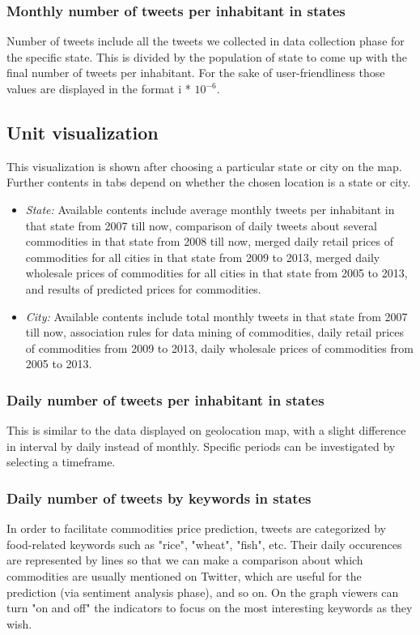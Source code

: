 \subsubsection*{Monthly number of tweets per inhabitant in states}
Number of tweets include all the tweets we collected in data collection phase for the specific state. This is divided by the population of state to come up with the final number of tweets per inhabitant. For the sake of user-friendliness those values are displayed in the format i * $10^{-6}$.


\subsection*{Unit visualization}
This visualization is shown after choosing a particular state or city on the map. Further contents in tabs depend on whether the chosen location is a state or city.
\begin{itemize}
\item \emph{State:} Available contents include average monthly tweets per inhabitant in that state from 2007 till now, comparison of daily tweets about several commodities in that state from 2008 till now, merged daily retail prices of commodities for all cities in that state from 2009 to 2013, merged daily wholesale prices of commodities for all cities in that state from 2005 to 2013, and results of predicted prices for commodities.
\item \emph{City:} Available contents include total monthly tweets in that state from 2007 till now, association rules for data mining of commodities, daily retail prices of commodities from 2009 to 2013, daily wholesale prices of commodities from 2005 to 2013.\\
\end{itemize}

\subsubsection*{Daily number of tweets per inhabitant in states}
This is similar to the data displayed on geolocation map, with a slight difference in interval by daily instead of monthly. Specific periods can be investigated by selecting a timeframe.

\subsubsection*{Daily number of tweets by keywords in states}
In order to facilitate commodities price prediction, tweets are categorized by food-related keywords such as "rice", "wheat", "fish", etc. Their daily occurences are represented by lines so that we can make a comparison about which commodities are usually mentioned on Twitter, which are useful for the prediction (via sentiment analysis phase), and so on. On the graph viewers can turn "on and off" the indicators to focus on the most interesting keywords as they wish.

